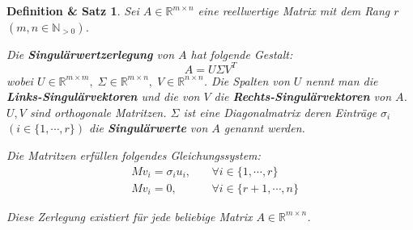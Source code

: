 \documentclass{article}
\newcommand{\R}[0]{\mathbb{R}}
\newtheorem{definthm}{Definition \& Satz}
\begin{document}
\begin{definthm}
    Sei $A \in \R^{m \times n}$ eine reellwertige Matrix mit dem Rang $r$ $(m,n \in \mathbb{N}_{>0})$.

    Die \textbf{Singulärwertzerlegung} von $A$  hat folgende Gestalt:
    \begin{equation}
        A = U \Sigma V^T
    \end{equation}
    wobei $U \in \R^{m \times m}, \; \Sigma \in \R^{m \times n}, \; V \in \R^{n \times n}$.
    Die Spalten von $U$ nennt man die \textbf{Links-Singulärvektoren} und die von $V$ die \textbf{Rechts-Singulärvektoren} von $A$. $U, V$ sind orthogonale Matritzen.
    $\Sigma$ ist eine Diagonalmatrix deren Einträge $\sigma_i$ $(i \in \{1, \cdots, r\})$ die \textbf{Singulärwerte} von $A$ genannt werden.
    
    Die Matritzen erfüllen folgendes Gleichungssystem:
    \begin{align}
        &Mv_i = \sigma_i u_i, \:&&\forall i \in \{1, \cdots, r\} \\
        &Mv_i = 0, \: &&\forall i \in \{r + 1, \cdots, n\}
    \end{align}

    Diese Zerlegung existiert für jede beliebige Matrix $A \in \R^{m \times n}$.
\end{definthm}
\end{document}

